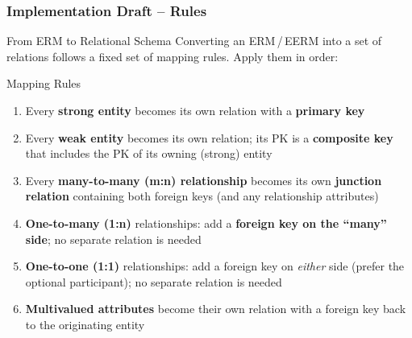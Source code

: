\begin{frame}
  \frametitle{Implementation Draft -- Rules}

  \begin{block}{From ERM to Relational Schema}
    Converting an ERM\,/\,EERM into a set of relations follows a fixed set of mapping rules. Apply them in order:
  \end{block}

  \begin{block}{Mapping Rules}
    \begin{enumerate}
      \item Every \textbf{strong entity} becomes its own relation with a \textbf{primary key}
      \item Every \textbf{weak entity} becomes its own relation; its PK is a \textbf{composite key} that includes the PK of its owning (strong) entity
      \item Every \textbf{many-to-many (m:n) relationship} becomes its own \textbf{junction relation} containing both foreign keys (and any relationship attributes)
      \item \textbf{One-to-many (1:n)} relationships: add a \textbf{foreign key on the ``many'' side}; no separate relation is needed
      \item \textbf{One-to-one (1:1)} relationships: add a foreign key on \textit{either} side (prefer the optional participant); no separate relation is needed
      \item \textbf{Multivalued attributes} become their own relation with a foreign key back to the originating entity
    \end{enumerate}
  \end{block}
\end{frame}

